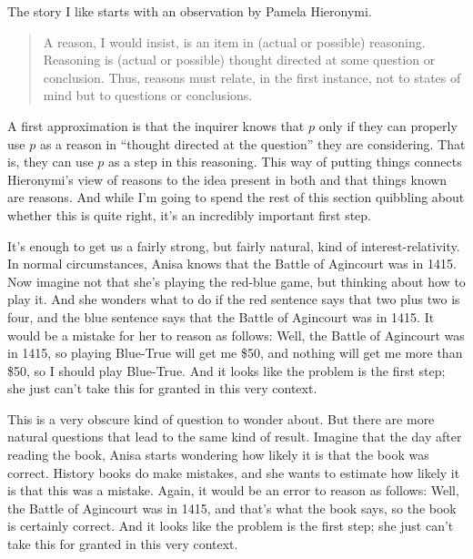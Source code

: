 \documentclass[11pt,]{book}
\begin{document}
The story I like starts with an observation by Pamela Hieronymi.

\begin{quote}
A reason, I would insist, is an item in (actual or possible) reasoning. Reasoning is (actual or possible) thought directed at some question or conclusion. Thus, reasons must relate, in the first instance, not to states of mind but to questions or conclusions. \citep[115-6]{Hieronymi2013}
\end{quote}

A first approximation is that the inquirer knows that \(p\) only if they can properly use \(p\) as a reason in ``thought directed at the question'' they are considering. That is, they can use \(p\) as a step in this reasoning. This way of putting things connects Hieronymi's view of reasons to the idea present in both \citet{HawthorneStanley2008} and \citet{FantlMcGrath2009} that things known are reasons. And while I'm going to spend the rest of this section quibbling about whether this is quite right, it's an incredibly important first step.

It's enough to get us a fairly strong, but fairly natural, kind of interest-relativity. In normal circumstances, Anisa knows that the Battle of Agincourt was in 1415. Now imagine not that she's playing the red-blue game, but thinking about how to play it. And she wonders what to do if the red sentence says that two plus two is four, and the blue sentence says that the Battle of Agincourt was in 1415. It would be a mistake for her to reason as follows: Well, the Battle of Agincourt was in 1415, so playing Blue-True will get me \$50, and nothing will get me more than \$50, so I should play Blue-True. And it looks like the problem is the first step; she just can't take this for granted in this very context.

This is a very obscure kind of question to wonder about. But there are more natural questions that lead to the same kind of result. Imagine that the day after reading the book, Anisa starts wondering how likely it is that the book was correct. History books do make mistakes, and she wants to estimate how likely it is that this was a mistake. Again, it would be an error to reason as follows: Well, the Battle of Agincourt was in 1415, and that's what the book says, so the book is certainly correct. And it looks like the problem is the first step; she just can't take this for granted in this very context.
\end{document}
